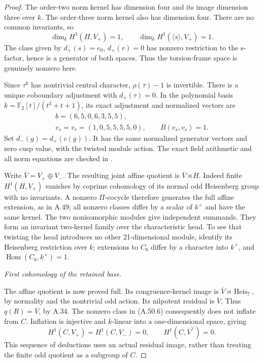 \begin{proof}
The order-two norm kernel has dimension four
and its image dimension three over \(k\).
The order-three norm kernel also has dimension
four. There are no common invariants, so
\[
 \dim_kH^1(\Pi,V_+)=1,
 \qquad \dim_kH^1(\langle s\rangle,V_+)=1.
 \tag{A.50.6}
\]
The class given by \(d_+(s)=e_0\),
\(d_+(r)=0\) has nonzero restriction to the
s-factor, hence is a generator of both spaces.
Thus the torsion-frame space is genuinely
nonzero here.

Since \(\tau^6\) has nontrivial central
character, \(\rho(\tau)-1\) is invertible.
There is a unique coboundary adjustment with
\(d_+(\tau)=0\). In the polynomial basis
\(k=\mathbb F_2[t]/(t^3+t+1)\), its exact
adjustment and normalized vectors are
\[
 \begin{gathered}
 b=(6,5,0,6,3,5,5),\\
 v_s=v_r=(1,0,5,5,5,5,0),
 \qquad B(v_s,v_s)=1.
 \end{gathered}
 \tag{A.50.7}
\]
Set \(d_-(g)=d_+(c(g))\). It has the same
normalized generator vectors and zero cusp
value, with the twisted module action.
The exact field arithmetic and all norm
equations are checked in
.

Write \(\overline V=V_+\oplus V_-\).
The resulting joint affine quotient is
\(\overline V\rtimes H\). Indeed finite
\(H^1(H,V_+)\) vanishes by coprime cohomology
of its normal odd Heisenberg group with no
invariants. A nonzero \(\Pi\)-cocycle therefore
generates the full affine extension, as in
A.49; all nonzero classes differ by a scalar
of \(k^\times\) and have the same kernel.
The two nonisomorphic modules give independent
summands. They form an invariant two-kernel
family over the characteristic head. To see
that twisting the head introduces no other
21-dimensional module, identify its
Heisenberg restriction over \(k\); extensions
to \(C_6\) differ by a character into
\(k^\times\), and
\(\operatorname{Hom}(C_6,k^\times)=1\).

\emph{First cohomology of the retained base.}\par
The affine quotient is now proved full.
Its congruence-kernel image is
\(\overline V\rtimes\operatorname{Heis}_7\),
by normality and the nontrivial odd action.
Its nilpotent residual is \(\overline V\).
Thus \(q(R)=\overline V\), by A.34.
The nonzero class in (A.50.6) consequently
does not inflate from \(C\). Inflation is
injective and \(k\)-linear into a
one-dimensional space, giving
\[
 H^1(C,V_+)=H^1(C,V_-)=0,
 \qquad H^1(C,\overline V^\vee)=0.
 \tag{A.50.8}
\]
This sequence of deductions uses an actual
residual image, rather than treating the
finite odd quotient as a subgroup of \(C\).


\end{proof}
